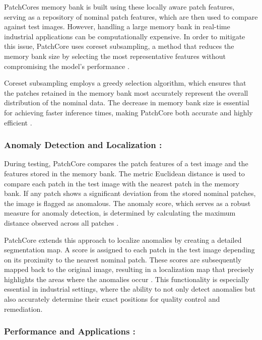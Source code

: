 PatchCores memory bank is built using these locally aware patch features, serving as a repository of nominal patch features, which are then used to compare against test images. However, handling a large memory bank in real-time industrial applications can be computationally expensive. In order to mitigate this issue, PatchCore uses coreset subsampling, a method that reduces the memory bank size by selecting the most representative features without compromising the model's performance \cite{roth2022totalrecallindustrialanomaly}.

Coreset subsampling employs a greedy selection algorithm, which ensures that the patches retained in the memory bank most accurately represent the overall distribution of the nominal data. The decrease in memory bank size is essential for achieving faster inference times, making PatchCore both accurate and highly efficient \cite{roth2022totalrecallindustrialanomaly}.

\subsubsection*{Anomaly Detection and Localization :}

During testing, PatchCore compares the patch features of a test image and the features stored in the memory bank. The metric Euclidean distance is used to compare each patch in the test image with the nearest patch in the memory bank. If any patch shows a significant deviation from the stored nominal patches, the image is flagged as anomalous. The anomaly score, which serves as a robust measure for anomaly detection, is determined by calculating the maximum distance observed across all patches \cite{roth2022totalrecallindustrialanomaly}.

PatchCore extends this approach to localize anomalies by creating a detailed segmentation map. A score is assigned to each patch in the test image depending on its proximity to the nearest nominal patch. These scores are subsequently mapped back to the original image, resulting in a localization map that precisely highlights the areas where the anomalies occur \cite{roth2022totalrecallindustrialanomaly}. This functionality is especially essential in industrial settings, where the ability to not only detect anomalies but also accurately determine their exact positions for quality control and remediation.

\subsubsection*{Performance and Applications :}

